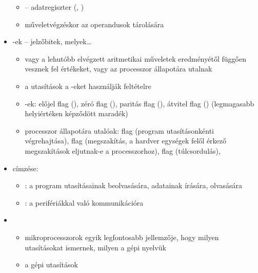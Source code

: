 \documentclass[main.tex]{subfiles}
\begin{document}
\begin{itemize}
\begin{itemize}
      \item {} – adatregiszter
      (, )

      \item műveletvégzéskor az operandusok tárolására
    \end{itemize}

    \item {}-ek – jelzőbitek, melyek\dots
    \begin{itemize}
      \item vagy a lehutóbb elvégzett aritmetikai
      műveletek eredményétől függően vesznek fel értékeket,
      vagy az processzor állapotára utalnak

      \item a  utasítások
      a -eket használják feltételre

      \item {}-ek:
      előjel flag (),
      zéró flag (),
      paritás flag (),
      átvitel flag ()
      (legmagasabb helyiértéken képződött maradék)

      \item processzor állapotára utalóak:
       flag (program utasításonkénti végrehajtása),
       flag (megszakítás,
      a hardver egységek felől érkező megszakítások
      eljutnak-e a processzorhoz),
       flag (túlcsordulás),
    \end{itemize}

    \item {} címzése:
    \begin{itemize}
      \item {}:
      a program utasításainak beolvasására,
      adatainak írására, olvasására

      \item {}:
      a perifériákkal való kommunikációra
    \end{itemize}

    \item {}
    \begin{itemize}
      \item mikroprocesszorok egyik legfontosabb jellemzője,
      hogy milyen utasításokat ismernek, milyen a gépi nyelvük

      \item a gépi utasítások 
      

\end{itemize}
\end{itemize}
\end{document}
